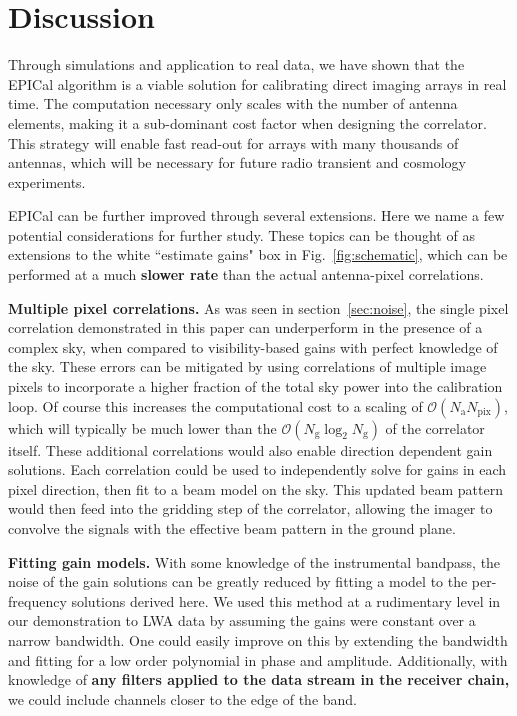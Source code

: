 \documentclass[a4paper,fleqn,usenatbib]{../mnras}
\newcommand{\Nant}{\ensuremath{N_{\mathrm{a}}}}
\newcommand{\Ng}{\ensuremath{N_{\mathrm{g}}}}
\begin{document}
\section{Discussion}\label{sec:discussion}
Through simulations and application to real data, we have shown that the EPICal algorithm is a 
viable solution for calibrating direct imaging arrays in real time. The computation necessary 
only scales with the number of antenna elements, making it a sub-dominant cost factor when 
designing the correlator. This strategy will enable fast read-out for arrays with many thousands 
of antennas, which will be necessary for future radio transient and cosmology experiments.

EPICal can be further improved through several extensions. Here we name a few potential 
considerations for further study. These topics can be thought of as extensions to the white 
``estimate gains" box in Fig.~\ref{fig:schematic}, which can be performed at a much 
\textbf{slower rate} than the actual antenna-pixel correlations.

\textbf{Multiple pixel correlations.} As was seen in section~\ref{sec:noise}, the single pixel 
correlation demonstrated in this paper can underperform in the presence of a complex sky, 
when compared to visibility-based gains with perfect knowledge of the sky. These errors can be 
mitigated by using correlations of multiple image pixels to incorporate a higher fraction of the 
total sky power into the calibration loop. Of course this increases the computational cost to a 
scaling of $\mathcal{O}(\Nant N_{\mathrm{pix}})$, which will typically be much lower than the 
$\mathcal{O}(\Ng \log_2 \Ng)$ of the correlator itself. These additional correlations would also 
enable direction dependent gain solutions. Each correlation could be used to independently 
solve for gains in each pixel direction, then fit to a beam model on the sky. This updated beam 
pattern would then feed into the gridding step of the correlator, allowing the imager to convolve 
the signals with the effective beam pattern in the ground plane. 

\textbf{Fitting gain models.} With some knowledge of the instrumental bandpass, the noise of 
the gain solutions can be greatly reduced by fitting a model to the per-frequency solutions 
derived here. We used this method at a rudimentary level in our demonstration to LWA data by 
assuming the gains were constant over a narrow bandwidth. One could easily improve on this 
by extending the bandwidth and fitting for a low order polynomial in phase and amplitude. 
Additionally, with knowledge of 
\textbf{any filters applied to the data stream in the receiver chain,}
we could include channels closer to the edge of the band.
\end{document}
